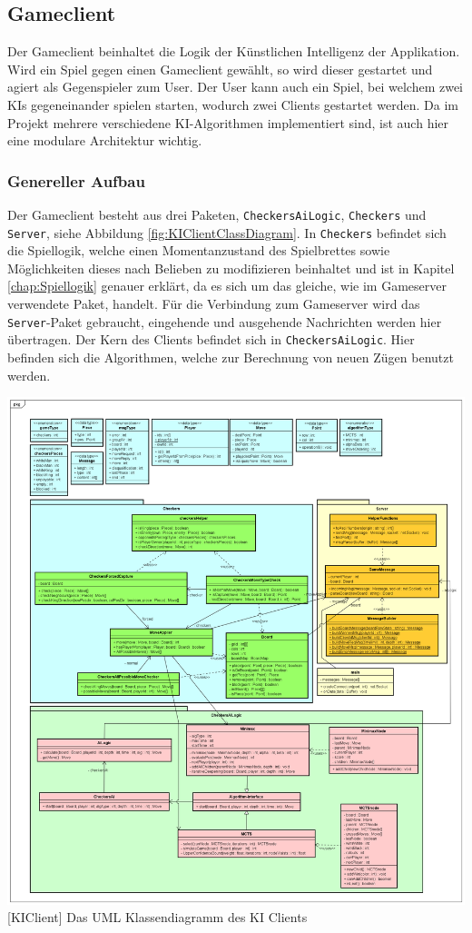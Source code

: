 \documentclass[12pt,a4paper,bibliography=totocnumbered,listof=totocnumbered]{article}
\begin{document}
\subsection{Gameclient}
Der Gameclient beinhaltet die Logik der Künstlichen Intelligenz der Applikation. Wird ein Spiel gegen einen Gameclient gewählt, so wird dieser gestartet und agiert als 
Gegenspieler zum User. Der User kann auch ein Spiel, bei welchem zwei KIs gegeneinander spielen starten, wodurch zwei Clients gestartet werden.
Da im Projekt mehrere verschiedene KI-Algorithmen implementiert sind, ist auch hier eine modulare Architektur wichtig.

\subsubsection{Genereller Aufbau}
Der Gameclient besteht aus drei Paketen, \texttt{CheckersAiLogic}, \texttt{Checkers} und \texttt{Server}, siehe Abbildung \ref{fig:KIClientClassDiagram}. 
In \texttt{Checkers} befindet sich die Spiellogik, welche einen Momentanzustand des Spielbrettes sowie Möglichkeiten dieses nach Belieben zu modifizieren beinhaltet 
und ist in Kapitel \ref{chap:Spiellogik} genauer erklärt, da es sich um das gleiche, wie im Gameserver verwendete Paket, handelt. 
Für die Verbindung zum Gameserver wird das \texttt{Server}-Paket gebraucht, eingehende und ausgehende Nachrichten werden hier übertragen.
Der Kern des Clients befindet sich in \texttt{CheckersAiLogic}. Hier befinden sich die Algorithmen, welche zur Berechnung von neuen Zügen 
benutzt werden.

\vspace{1em}
\begin{minipage}{\linewidth}
	\centering
	\includegraphics[width=0.9\linewidth]{pics/GameClientClassDiagram.png}
	[KIClient]{ Das UML Klassendiagramm des KI Clients }
	\label{fig:KIClientClassDiagram}
\end{minipage}
\end{document}
